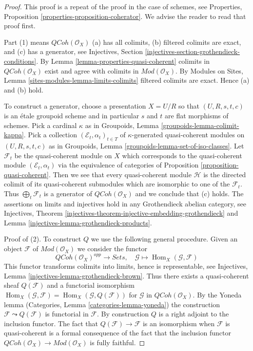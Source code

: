\documentclass{stacks-project}
\theoremstyle{plain}
\theoremstyle{definition}
\theoremstyle{remark}
\numberwithin{equation}{subsection}
\def\Hom{\mathop{\mathrm{Hom}}\nolimits}
\def\QCoh{\mathit{QCoh}}
\begin{document}
\begin{proof}
This proof is a repeat of the proof in the case of schemes, see
Properties, Proposition \ref{properties-proposition-coherator}.
We advise the reader to read that proof first.

\medskip\noindent
Part (1) means $\QCoh(\mathcal{O}_X)$ (a) has all colimits,
(b) filtered colimits are exact, and (c) has a generator, see
Injectives, Section \ref{injectives-section-grothendieck-conditions}.
By Lemma \ref{lemma-properties-quasi-coherent}
colimits in $\QCoh(\mathcal{O}_X)$ exist and agree
with colimits in $\textit{Mod}(\mathcal{O}_X)$. By
Modules on Sites, Lemma \ref{sites-modules-lemma-limits-colimits}
filtered colimits are exact. Hence (a) and (b) hold.

\medskip\noindent
To construct a generator, choose a presentation $X = U/R$ so that
$(U, R, s, t, c)$ is an
\'etale groupoid scheme and in particular $s$ and $t$ are flat morphisms
of schemes. Pick a cardinal $\kappa$ as in
Groupoids, Lemma \ref{groupoids-lemma-colimit-kappa}.
Pick a collection $(\mathcal{E}_t, \alpha_t)_{t \in T}$ of
$\kappa$-generated quasi-coherent modules on
$(U, R, s, t, c)$ as in
Groupoids, Lemma \ref{groupoids-lemma-set-of-iso-classes}.
Let $\mathcal{F}_t$ be the quasi-coherent module on $X$ which
corresponds to the quasi-coherent module $(\mathcal{E}_t, \alpha_t)$ via
the equivalence of categories of
Proposition \ref{proposition-quasi-coherent}.
Then we see that every quasi-coherent module $\mathcal{H}$ is the
directed colimit of its quasi-coherent submodules which are isomorphic
to one of the $\mathcal{F}_t$. Thus $\bigoplus_t \mathcal{F}_t$ is
a generator of $\QCoh(\mathcal{O}_X)$ and we conclude that (c) holds.
The assertions on limits and injectives hold in any
Grothendieck abelian category, see
Injectives, Theorem
\ref{injectives-theorem-injective-embedding-grothendieck} and
Lemma \ref{injectives-lemma-grothendieck-products}.

\medskip\noindent
Proof of (2). To construct $Q$ we use the following general procedure.
Given an object $\mathcal{F}$ of $\textit{Mod}(\mathcal{O}_X)$
we consider the functor
$$
\QCoh(\mathcal{O}_X)^{opp} \longrightarrow \textit{Sets},\quad
\mathcal{G} \longmapsto \Hom_X(\mathcal{G}, \mathcal{F})
$$
This functor transforms colimits into limits,
hence is representable, see
Injectives, Lemma \ref{injectives-lemma-grothendieck-brown}.
Thus there exists a quasi-coherent sheaf $Q(\mathcal{F})$
and a functorial isomorphism
$\Hom_X(\mathcal{G}, \mathcal{F}) = \Hom_X(\mathcal{G}, Q(\mathcal{F}))$
for $\mathcal{G}$ in $\QCoh(\mathcal{O}_X)$. By the Yoneda lemma
(Categories, Lemma \ref{categories-lemma-yoneda})
the construction $\mathcal{F} \leadsto Q(\mathcal{F})$ is
functorial in $\mathcal{F}$. By construction $Q$ is a right
adjoint to the inclusion functor.
The fact that $Q(\mathcal{F}) \to \mathcal{F}$ is an isomorphism
when $\mathcal{F}$ is quasi-coherent is a formal consequence of the fact
that the inclusion functor
$\QCoh(\mathcal{O}_X) \to \textit{Mod}(\mathcal{O}_X)$
is fully faithful.
\end{proof}
\end{document}
